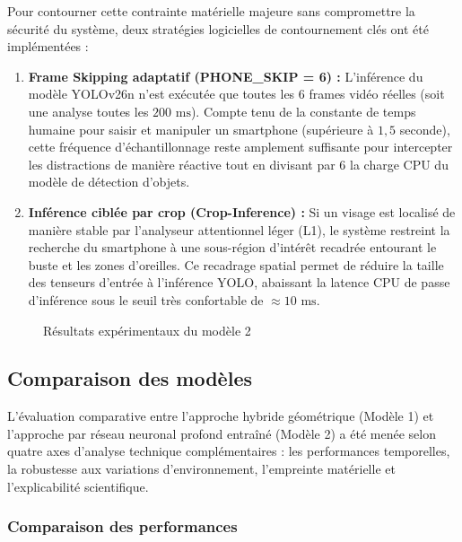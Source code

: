 Pour contourner cette contrainte matérielle majeure sans compromettre la sécurité du système, deux stratégies logicielles de contournement clés ont été implémentées :
\begin{enumerate}
    \item \textbf{Frame Skipping adaptatif (PHONE\_SKIP = 6) :} L'inférence du modèle YOLOv26n n'est exécutée que toutes les 6 frames vidéo réelles (soit une analyse toutes les $200\text{ ms}$). Compte tenu de la constante de temps humaine pour saisir et manipuler un smartphone (supérieure à $1,5$ seconde), cette fréquence d'échantillonnage reste amplement suffisante pour intercepter les distractions de manière réactive tout en divisant par 6 la charge CPU du modèle de détection d'objets.
    \item \textbf{Inférence ciblée par crop (Crop-Inference) :} Si un visage est localisé de manière stable par l'analyseur attentionnel léger (L1), le système restreint la recherche du smartphone à une sous-région d'intérêt recadrée entourant le buste et les zones d'oreilles. Ce recadrage spatial permet de réduire la taille des tenseurs d'entrée à l'inférence YOLO, abaissant la latence CPU de passe d'inférence sous le seuil très confortable de $\approx 10\text{ ms}$.
\end{enumerate}

\begin{figure}[H]
    \centering
    \caption{Résultats expérimentaux du modèle 2}
    \label{fig:results_model2}
\end{figure}

\subsection{Comparaison des modèles}

L'évaluation comparative entre l'approche hybride géométrique (Modèle 1) et l'approche par réseau neuronal profond entraîné (Modèle 2) a été menée selon quatre axes d'analyse technique complémentaires : les performances temporelles, la robustesse aux variations d'environnement, l'empreinte matérielle et l'explicabilité scientifique.

\subsubsection{Comparaison des performances}

